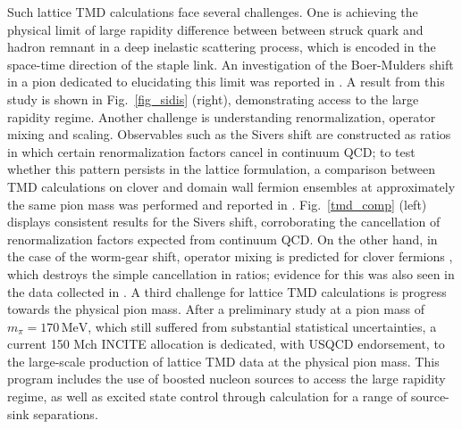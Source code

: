 Such lattice TMD calculations face several challenges. One is achieving
the physical limit of large rapidity difference between between struck
quark and hadron remnant in a deep inelastic scattering process, which
is encoded in the space-time direction of the staple link. An investigation
of the Boer-Mulders shift in a pion dedicated to elucidating this limit
was reported in \cite{Engelhardt:2015xja}. A result from this study is
shown in Fig.~\ref{fig_sidis} (right), demonstrating access to the large
rapidity regime. Another challenge is understanding renormalization,
operator mixing and scaling. Observables such as the Sivers shift are
constructed as ratios in which certain renormalization factors cancel
in continuum QCD; to test whether this pattern persists in the lattice
formulation, a comparison between TMD calculations on clover and domain
wall fermion ensembles at approximately the same pion mass was performed
and reported in \cite{Yoon:2017qzo}. Fig.~\ref{tmd_comp} (left) displays
consistent results for the Sivers shift, corroborating the cancellation
of renormalization factors expected from continuum QCD. On the other hand,
in the case of the worm-gear shift, operator mixing is predicted for
clover fermions \cite{Constantinou:2017sej}, which destroys the simple
cancellation in ratios; evidence for this was also seen in the data
collected in \cite{Yoon:2017qzo}. A third challenge for lattice TMD
calculations is progress towards the physical pion mass. After a
preliminary study \cite{Engelhardt:2015czw}
at a pion mass of $m_{\pi } = 170\, \mbox{MeV} $,
which still suffered from substantial statistical uncertainties,
a current 150 Mch INCITE allocation is dedicated, with USQCD endorsement,
to the large-scale production of lattice TMD data at the physical pion mass.
This program includes the use of boosted nucleon sources to access the
large rapidity regime, as well as excited state control through
calculation for a range of source-sink separations.

